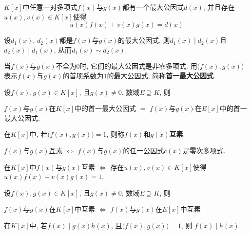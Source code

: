 \begin{Theorem}[!]
$K[x]$中任意一对多项式$f(x)$与$g(x)$都有一个最大公因式$d(x)$, 并且存在$u(x), v(x) \in K[x]$使得
\[
	u(x) f(x) + v(x) g(x) = d(x)
\]
\end{Theorem}

\begin{Note}
设$d_1(x)$, $d_2(x)$都是$f(x)$与$g(x)$的最大公因式, 则$d_1(x) \mid d_2(x)$且$d_2(x) \mid d_1(x)$, 从而$d_1(x) \sim d_2(x)$.
\end{Note}

\begin{Note}
当$f(x)$与$g(x)$不全为$0$时, 它们的最大公因式是非零多项式. 用$\Big( f(x), g(x) \Big)$表示$f(x)$与$g(x)$的首项系数为$1$的最大公因式,
简称\textbf{首一最大公因式}.
\end{Note}

\begin{Proposition}[首一最大公因式不随数域的扩大而改变]
设$f(x), g(x) \in K[x]$, 且$g(x) \neq 0$, 数域$E \supseteq K$, 则
\begin{center}
$f(x)$与$g(x)$在$K[x]$中的首一最大公因式 $=$ $f(x)$与$g(x)$在$E[x]$中的首一最大公因式.
\end{center}
\end{Proposition}

\begin{Definition}[互素]
在$K[x]$中, 若$\Big( f(x), g(x) \Big) = 1$, 则称$f(x)$和$g(x)$\textbf{互素}.
\end{Definition}

\begin{Note}
$f(x)$与$g(x)$互素 $\iff$ $f(x)$与$g(x)$的任一公因式$c(x)$是零次多项式.
\end{Note}

\begin{Theorem}[!]
在$K[x]$中$f(x)$与$g(x)$互素 $\iff$ 存在$u(x), v(x) \in K[x]$使得$u(x) f(x) +v(x) g(x) = 1$.
\end{Theorem}

\begin{Proposition}[互素性不随数域的扩大而改变]
设$f(x), g(x) \in K[x]$, 且$g(x) \neq 0$, 数域$E \supseteq K$, 则
\begin{center}
$f(x)$与$g(x)$在$K[x]$中互素 $\iff$ $f(x)$与$g(x)$在$E[x]$中互素 
\end{center}
\end{Proposition}

\begin{Property}[!]
在$K[x]$中, 若$f(x) \mid g(x) h(x)$, 且$\Big( f(x), g(x) \Big) = 1$, 则 $f(x) \mid h(x)$.
\end{Property}


